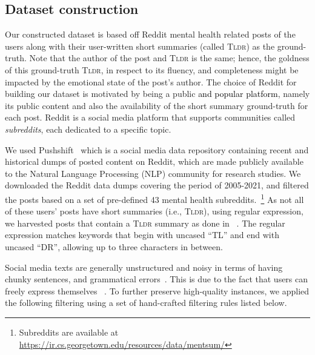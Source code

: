 \documentclass[10pt, a4paper]{article}
\newcommand{\tldr}{\textsc{Tldr}}
\begin{document}
\subsection{Dataset construction}
\label{sec:dataset_cons}






Our constructed dataset is based off Reddit mental health related posts of the users along with their user-written short summaries (called \tldr) as the ground-truth. Note that the author of the post and \tldr{} is the same; hence, the goldness of this ground-truth \tldr{}, in respect to its fluency, and completeness might be impacted by the emotional state of the post's author. The choice of Reddit for building our dataset is motivated by being a public \textcolor{black}{ and popular platform}, namely its public content and also the availability of the short summary ground-truth for each post. Reddit is a social media platform that supports communities called \textit{subreddits}, each dedicated to a specific topic.   

We used Pushshift~\cite{Baumgartner2020ThePR} which is a social media data repository containing recent and historical dumps of posted content on Reddit, which are made publicly available to the Natural Language Processing (NLP) community for research studies. We downloaded the Reddit data dumps covering the period of 2005-2021, and filtered the posts based on a set of pre-defined 43 mental health subreddits.~\footnote{Subreddits are available at \url{https://ir.cs.georgetown.edu/resources/data/mentsum/}} 
As not all of these users' posts have short summaries (i.e., \tldr), using regular expression, we harvested posts that contain a \tldr{} summary as done in ~\cite{volske-etal-2017-tl,sotudeh-etal-2021-tldr9}. The regular expression matches keywords that begin with uncased ``TL'' and end with uncased ``DR'', allowing up to three characters in between.

Social media texts are generally unstructured and noisy in terms of having chunky sentences, and grammatical errors~\cite{Baldwin2013HowNS}. This is due to the fact that users can freely express themselves ~\cite{Liu2016TheGT}. To further preserve high-quality instances, we applied the following filtering using a set of hand-crafted filtering rules listed below. 
\end{document}
